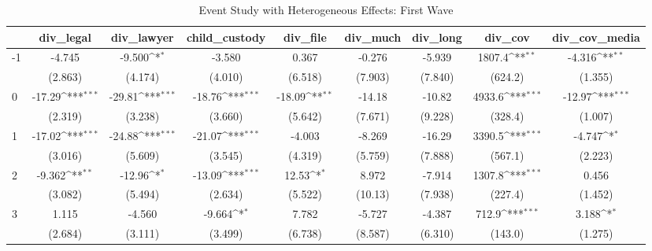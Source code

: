 \documentclass{article}
\begin{document}
{
\def\sym#1{\ifmmode^{#1}\else\(^{#1}\)\fi}
\begin{longtable}{l*{8}{c}}
\caption{Event Study with Heterogeneous Effects: First Wave}\\
\hline\hline\endfirsthead\hline\endhead\hline\endfoot\endlastfoot
                &\multicolumn{1}{c}{div\_legal}&\multicolumn{1}{c}{div\_lawyer}&\multicolumn{1}{c}{child\_custody}&\multicolumn{1}{c}{div\_file}&\multicolumn{1}{c}{div\_much}&\multicolumn{1}{c}{div\_long}&\multicolumn{1}{c}{div\_cov}&\multicolumn{1}{c}{div\_cov\_media}\\
\hline
-1              &   -4.745         &   -9.500\sym{*}  &   -3.580         &    0.367         &   -0.276         &   -5.939         &   1807.4\sym{**} &   -4.316\sym{**} \\
                &  (2.863)         &  (4.174)         &  (4.010)         &  (6.518)         &  (7.903)         &  (7.840)         &  (624.2)         &  (1.355)         \\
0               &   -17.29\sym{***}&   -29.81\sym{***}&   -18.76\sym{***}&   -18.09\sym{**} &   -14.18         &   -10.82         &   4933.6\sym{***}&   -12.97\sym{***}\\
                &  (2.319)         &  (3.238)         &  (3.660)         &  (5.642)         &  (7.671)         &  (9.228)         &  (328.4)         &  (1.007)         \\
1               &   -17.02\sym{***}&   -24.88\sym{***}&   -21.07\sym{***}&   -4.003         &   -8.269         &   -16.29         &   3390.5\sym{***}&   -4.747\sym{*}  \\
                &  (3.016)         &  (5.609)         &  (3.545)         &  (4.319)         &  (5.759)         &  (7.888)         &  (567.1)         &  (2.223)         \\
2               &   -9.362\sym{**} &   -12.96\sym{*}  &   -13.09\sym{***}&    12.53\sym{*}  &    8.972         &   -7.914         &   1307.8\sym{***}&    0.456         \\
                &  (3.082)         &  (5.494)         &  (2.634)         &  (5.522)         &  (10.13)         &  (7.938)         &  (227.4)         &  (1.452)         \\
3               &    1.115         &   -4.560         &   -9.664\sym{*}  &    7.782         &   -5.727         &   -4.387         &    712.9\sym{***}&    3.188\sym{*}  \\
                &  (2.684)         &  (3.111)         &  (3.499)         &  (6.738)         &  (8.587)         &  (6.310)         &  (143.0)         &  (1.275)         \\

\end{longtable}}
\end{document}

